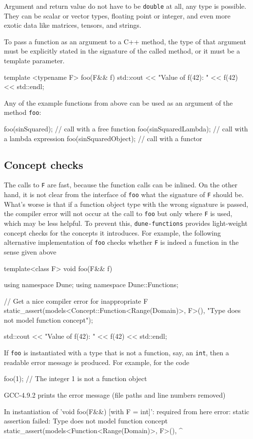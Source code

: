 \documentclass[11pt,
                 numbers=noenddot,
                 headings=normal,
                 DIV16, BCOR10mm]{scrartcl}
\newcommand{\cpp}{\lstinline}
\theoremstyle{remark}
\newcommand{\dunemodule}[1]{\texttt{#1}}
\begin{document}
Argument and return value do not have to be \cpp{double} at all,
any type is possible.
They can be scalar or vector types, floating point or integer,
and even more exotic data like matrices, tensors, and strings.

To pass a function as an argument to a C++ method, the type of that argument must be explicitly stated
in the signature of the called method, or it must be a template parameter.
\begin{c++}
template <typename F>
foo(F&& f)
{
  std::cout << "Value of f(42): " << f(42) << std::endl;
}
\end{c++}
Any of the example functions from above can be used as an argument of the method \cpp{foo}:
\begin{c++}
foo(sinSquared);             // call with a free function
foo(sinSquaredLambda);       // call with a lambda expression
foo(sinSquaredObject);       // call with a functor
\end{c++}

\subsection{Concept checks}

The calls to \cpp{F} are fast, because the function calls can be inlined.
On the other hand, it is not clear from the interface of \cpp{foo} what the signature of \cpp{F} should be.
What's worse is that if a function object type with the wrong signature is passed, the compiler error will not occur
at the call to \cpp{foo} but only where \cpp{F} is used, which may be less helpful. To prevent this, \dunemodule{dune-functions}
provides light-weight concept checks for the concepts it introduces. For example, the following alternative
implementation of \cpp{foo} checks whether \cpp{F} is indeed a function in the sense given above
\begin{c++}
template<class F>
void foo(F&& f)
{
  using namespace Dune;
  using namespace Dune::Functions;

  // Get a nice compiler error for inappropriate F
  static_assert(models<Concept::Function<Range(Domain)>, F>(),
      "Type does not model function concept");

  std::cout << "Value of f(42): " << f(42) << std::endl;
}
\end{c++}
If \cpp{foo} is instantiated with a type that is not a function, say, an \cpp{int}, then a
readable error message is produced. For example, for the code
\begin{c++}
foo(1);     // The integer 1 is not a function object
\end{c++}
GCC-4.9.2 prints the error message (file paths and line numbers removed)
\begin{error}
In instantiation of 'void foo(F&&) [with F = int]':
  required from here
error: static assertion failed: Type does not model function concept
   static_assert(models<Function<Range(Domain)>, F>(),
   ^
\end{error}
\end{document}
